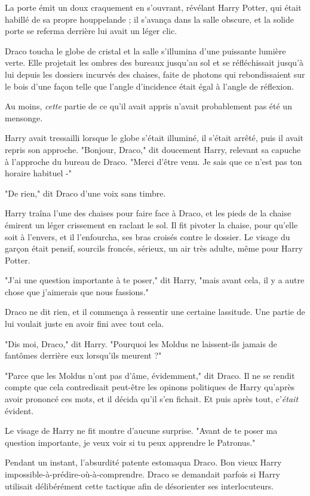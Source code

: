 La porte émit un doux craquement en s'ouvrant, révélant Harry Potter, qui était habillé de sa propre houppelande ; il s'avança dans la salle obscure, et la solide porte se referma derrière lui avait un léger clic.

Draco toucha le globe de cristal et la salle s'illumina d'une puissante lumière verte. Elle projetait les ombres des bureaux jusqu'au sol et se réfléchissait jusqu'à lui depuis les dossiers incurvés des chaises, faite de photons qui rebondissaient sur le bois d'une façon telle que l'angle d'incidence était égal à l'angle de réflexion.

Au moins, \emph{cette}  partie de ce qu'il avait appris n'avait probablement pas été un mensonge.

Harry avait tressailli lorsque le globe s'était illuminé, il s'était arrêté, puis il avait repris son approche. "Bonjour, Draco," dit doucement Harry, relevant sa capuche à l'approche du bureau de Draco. "Merci d'être venu. Je sais que ce n'est pas ton horaire habituel -"

"De rien," dit Draco d'une voix sans timbre.

Harry traîna l'une des chaises pour faire face à Draco, et les pieds de la chaise émirent un léger crissement en raclant le sol. Il fit pivoter la chaise, pour qu'elle soit à l'envers, et il l'enfourcha, ses bras croisés contre le dossier. Le visage du garçon était pensif, sourcils froncés, sérieux, un air très adulte, même pour Harry Potter.

"J'ai une question importante à te poser," dit Harry, "mais avant cela, il y a autre chose que j'aimerais que nous fassions."

Draco ne dit rien, et il commença à ressentir une certaine lassitude. Une partie de lui voulait juste en avoir fini avec tout cela.

"Dis moi, Draco," dit Harry. "Pourquoi les Moldus ne laissent-ils jamais de fantômes derrière eux lorsqu'ils meurent ?"

"Parce que les Moldus n'ont pas d'âme, évidemment," dit Draco. Il ne se rendit compte que cela contredisait peut-être les opinons politiques de Harry qu'après avoir prononcé ces mots, et il décida qu'il s'en fichait. Et puis après tout, c'\emph{était } évident.

Le visage de Harry ne fit montre d'aucune surprise. "Avant de te poser ma question importante, je veux voir si tu peux apprendre le Patronus."

Pendant un instant, l'absurdité patente estomaqua Draco. Bon vieux Harry impossible-à-prédire-où-à-comprendre. Draco se demandait parfois si Harry utilisait délibérément cette tactique afin de désorienter ses interlocuteurs.

